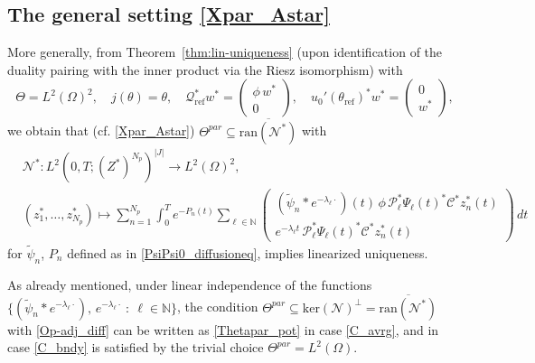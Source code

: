 \documentclass[12pt]{article}
\newcommand\Op{\mathcal{N}}
\newcommand\Proj{\mathcal{P}}
\newcommand\hrefprime{\mathcal{Q}_{\text{ref}}}
\newcommand\Contr{P}
\newcommand\Ncont{N_p}
\begin{document}
\subsection{The general setting \eqref{Xpar_Astar}} 
More generally, from Theorem~\ref{thm:lin-uniqueness} (upon identification of the duality pairing with the inner product via the Riesz isomorphism) with 
\[
\Theta= L^2(\Omega)^2, \quad j(\theta)=\theta, \quad \hrefprime^*w^*=
\begin{pmatrix}\phi\,w^*\\0\end{pmatrix}, \quad
u_0'(\theta_{\text{ref}})^*w^*=\begin{pmatrix}0\\w^*\end{pmatrix},
\]
 we obtain that 
(cf. \eqref{Xpar_Astar})
$
\Theta^{par}\subseteq\overline{\text{ran}(\Op^*)}
$
with 
\begin{equation}\label{Op-adj_diff}
\begin{aligned}
&\Op^*:L^2(0,T;(Z^*)^{\Ncont})^{|J|}\to L^2(\Omega)^2, \quad \\ &
(z_1^*,\ldots,z_{\Ncont}^*)\mapsto 
\sum_{n=1}^{\Ncont}
\int_0^T e^{-\Contr_n(t)}
\sum_{\ell\in\mathbb{N}}
\left(\begin{array}{c}
(\tilde{\psi}_n*e^{-\lambda_\ell \cdot})(t)\,\phi\,\Proj_\ell^*\Psi_\ell(t)^*\mathcal{C}^*z_n^*(t)\\ e^{-\lambda_\ell t}\,\Proj_\ell^*\Psi_\ell(t)^*\mathcal{C}^*z_n^*(t)
\end{array}\right)\, dt
\end{aligned}
\end{equation}
for $\tilde{\psi}_n$, $\Contr_n$ defined as in \eqref{PsiPsi0_diffusioneq},
implies linearized uniqueness.

As already mentioned, under linear independence of the functions 
$\{(\tilde{\psi}_n*e^{-\lambda_\ell \cdot}),\, e^{-\lambda_\ell \cdot}\ : \ \ell\in\mathbb{N}\}$, the condition 
$\Theta^{par}\subseteq\text{ker}(\Op)^\bot=\overline{\text{ran}(\Op^*)}$ 
with \eqref{Op-adj_diff}
can be written as \eqref{Thetapar_pot} in case \eqref{C_avrg}, 
and in case \eqref{C_bndy} is satisfied by the trivial choice 
$\Theta^{par}=L^2(\Omega)$.
\end{document}
